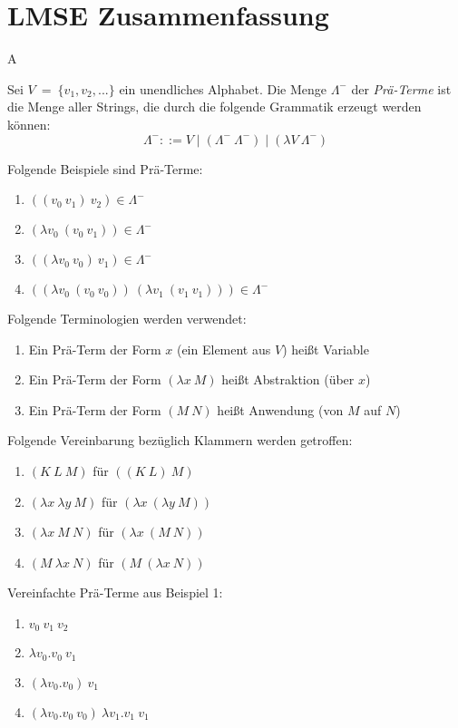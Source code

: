 \documentclass{scrartcl}
\begin{document}
\section{LMSE Zusammenfassung}
A
\begin{definition}
	Sei $V~=~\{v_1, v_2,...\}$ ein unendliches Alphabet. Die Menge $\Lambda^-$ der \emph{Prä-Terme} ist die Menge aller Strings, die durch die folgende Grammatik erzeugt werden können:\\
	\[\Lambda ^- ::= V \mid (\Lambda ^-~\Lambda ^-) \mid (\lambda V~\Lambda ^-) \]
\end{definition}
\begin{beispiel}
	Folgende Beispiele sind Prä-Terme:
	\begin{enumerate}
		\item $((v_0~v_1)~v_2) \in \Lambda^-$
		\item $(\lambda v_0~(v_0~v_1)) \in \Lambda^-$
		\item $((\lambda v_0~v_0)~v_1) \in \Lambda^-$
		\item $((\lambda v_0~(v_0~v_0))~(\lambda v_1~(v_1~v_1))) \in \Lambda^-$		
	\end{enumerate}
\end{beispiel}
Folgende Terminologien werden verwendet:

\begin{enumerate}
	\item Ein Prä-Term der Form $x$ (ein Element aus $V$) heißt Variable
	\item Ein Prä-Term der Form $(\lambda x~M)$ heißt Abstraktion (über $x$)
	\item Ein Prä-Term der Form $(M~N)$ heißt Anwendung (von $M$ auf $N$) 
\end{enumerate}

Folgende Vereinbarung bezüglich Klammern werden getroffen:

\begin{enumerate}
	\item $(K~L~M)$ für $((K~L)~M)$
	\item $(\lambda x~\lambda y~M)$ für $(\lambda x~(\lambda y~M))$
	\item $(\lambda x~M~N)$ für $(\lambda x~(M~N))$
	\item $(M~\lambda x~N)$ für $(M~(\lambda x~N))$
\end{enumerate}


\begin{beispiel}
	Vereinfachte Prä-Terme aus Beispiel 1:
	\begin{enumerate}
		\item $v_0~v_1~v_2$
		\item $\lambda v_0.v_0~v_1$
		\item $(\lambda v_0.v_0)~v_1$
		\item $(\lambda v_0.v_0~v_0)~\lambda v_1.v_1~v_1$
	\end{enumerate}
\end{beispiel}
\end{document}
